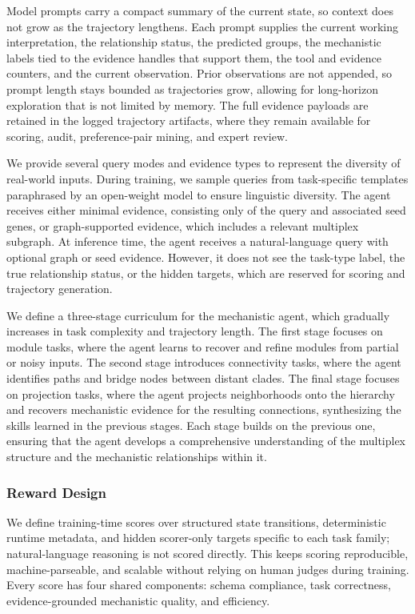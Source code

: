 Model prompts carry a compact summary of the current state, so context does not grow as the trajectory lengthens. Each prompt supplies the current working interpretation, the relationship status, the predicted groups, the mechanistic labels tied to the evidence handles that support them, the tool and evidence counters, and the current observation. Prior observations are not appended, so prompt length stays bounded as trajectories grow, allowing for long-horizon exploration that is not limited by memory. The full evidence payloads are retained in the logged trajectory artifacts, where they remain available for scoring, audit, preference-pair mining, and expert review.

We provide several query modes and evidence types to represent the diversity of real-world inputs. During training, we sample queries from task-specific templates paraphrased by an open-weight model to ensure linguistic diversity. The agent receives either minimal evidence, consisting only of the query and associated seed genes, or graph-supported evidence, which includes a relevant multiplex subgraph. At inference time, the agent receives a natural-language query with optional graph or seed evidence. However, it does not see the task-type label, the true relationship status, or the hidden targets, which are reserved for scoring and trajectory generation.

We define a three-stage curriculum for the mechanistic agent, which gradually increases in task complexity and trajectory length. The first stage focuses on module tasks, where the agent learns to recover and refine modules from partial or noisy inputs. The second stage introduces connectivity tasks, where the agent identifies paths and bridge nodes between distant clades. The final stage focuses on projection tasks, where the agent projects neighborhoods onto the hierarchy and recovers mechanistic evidence for the resulting connections, synthesizing the skills learned in the previous stages. Each stage builds on the previous one, ensuring that the agent develops a comprehensive understanding of the multiplex structure and the mechanistic relationships within it.

\subsubsection{Reward Design}\label{sec:ch4-reward}
We define training-time scores over structured state transitions, deterministic runtime metadata, and hidden scorer-only targets specific to each task family; natural-language reasoning is not scored directly. This keeps scoring reproducible, machine-parseable, and scalable without relying on human judges during training. Every score has four shared components: schema compliance, task correctness, evidence-grounded mechanistic quality, and efficiency.

